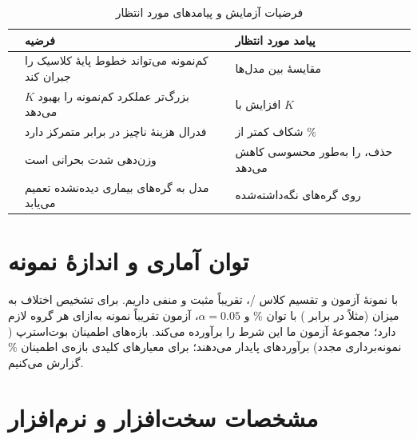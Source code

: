 \begin{table}[htbp]
\centering
\caption{فرضیات آزمایش و پیامدهای مورد انتظار}
\footnotesize
\setlength{\tabcolsep}{2pt}
\renewcommand{\arraystretch}{1.14}
\begin{tabularx}{\linewidth}{@{}C{1.15cm}R{4.15cm}Y@{}}
\toprule
\textbf{} & \textbf{فرضیه} & \textbf{پیامد مورد انتظار} \\
\midrule
{} & کم‌نمونه می‌تواند خطوط پایۀ کلاسیک را جبران کند & مقایسۀ  بین مدل‌ها \\
 & $K$ بزرگ‌تر عملکرد کم‌نمونه را بهبود می‌دهد & افزایش  با $K$ \\
 & فدرال هزینۀ ناچیز در برابر متمرکز دارد & شکاف کمتر از \%  \\
 & وزن‌دهی شدت بحرانی است & حذف،  را به‌طور محسوسی کاهش می‌دهد \\
 & مدل به گره‌های بیماری دیده‌نشده تعمیم می‌یابد & \mbox{} روی گره‌های نگه‌داشته‌شده \\
\bottomrule
\end{tabularx}
\label{tab:exp_hypotheses}
\end{table}

\section{توان آماری و اندازۀ نمونه}

با  نمونۀ آزمون و تقسیم کلاس /، تقریباً  مثبت و  منفی داریم. برای تشخیص اختلاف  به میزان  (مثلاً  در برابر ) با توان \% و $\alpha = 0.05$، آزمون  تقریباً  نمونه به‌ازای هر گروه لازم دارد؛ مجموعۀ آزمون ما این شرط را برآورده می‌کند. بازه‌های اطمینان بوت‌استرپ ( نمونه‌برداری مجدد) برآوردهای پایدار می‌دهند؛ برای معیارهای کلیدی بازه‌ی اطمینان \% گزارش می‌کنیم.

\section{مشخصات سخت‌افزار و نرم‌افزار}

